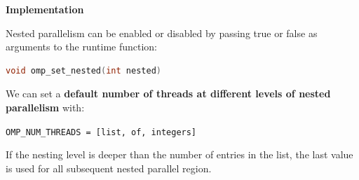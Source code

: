 \newpage

\begin{flushleft}
    \textcolor{Green3}{ \textbf{Implementation}}
\end{flushleft}
Nested parallelism can be enabled or disabled by passing true or false as arguments to the runtime function:
\begin{openmpbox}
    \begin{lstlisting}[language=C++]
void omp_set_nested(int nested)\end{lstlisting}
\end{openmpbox}

\noindent
We can set a \textbf{default number of threads at different levels of nested parallelism} with:
\begin{center}
    \texttt{OMP\_NUM\_THREADS = [list, of, integers]}
\end{center}
If the nesting level is deeper than the number of entries in the list, the last value is used for all subsequent nested parallel region.

